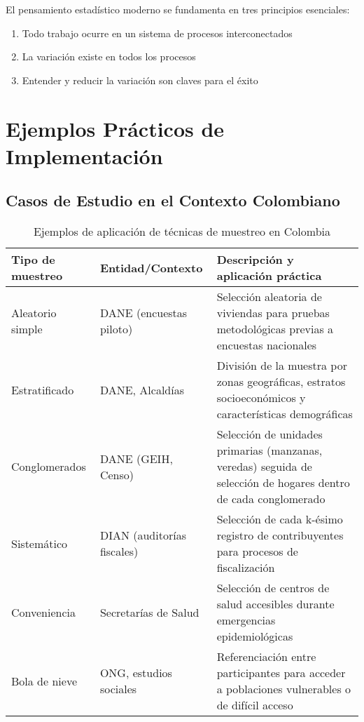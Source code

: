 \begin{remark}
El pensamiento estadístico moderno se fundamenta en tres principios esenciales: 
\begin{enumerate}
\item Todo trabajo ocurre en un sistema de procesos interconectados
\item La variación existe en todos los procesos
\item Entender y reducir la variación son claves para el éxito
\end{enumerate}
\end{remark}

\section{Ejemplos Prácticos de Implementación}

\subsection{Casos de Estudio en el Contexto Colombiano}

\begin{table}[h!]
\centering
\caption{Ejemplos de aplicación de técnicas de muestreo en Colombia}
\begin{tabular}{|p{3cm}|p{4cm}|p{6cm}|}
\hline
\textbf{Tipo de muestreo} & \textbf{Entidad/Contexto} & \textbf{Descripción y aplicación práctica} \\
\hline
Aleatorio simple & DANE (encuestas piloto) & Selección aleatoria de viviendas para pruebas metodológicas previas a encuestas nacionales \\
\hline
Estratificado & DANE, Alcaldías & División de la muestra por zonas geográficas, estratos socioeconómicos y características demográficas \\
\hline
Conglomerados & DANE (GEIH, Censo) & Selección de unidades primarias (manzanas, veredas) seguida de selección de hogares dentro de cada conglomerado \\
\hline
Sistemático & DIAN (auditorías fiscales) & Selección de cada k-ésimo registro de contribuyentes para procesos de fiscalización \\
\hline
Conveniencia & Secretarías de Salud & Selección de centros de salud accesibles durante emergencias epidemiológicas \\
\hline
Bola de nieve & ONG, estudios sociales & Referenciación entre participantes para acceder a poblaciones vulnerables o de difícil acceso \\
\hline
\end{tabular}
\end{table}

